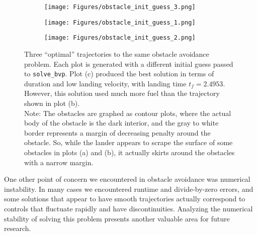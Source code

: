 \documentclass{article}
\begin{document}
\begin{figure}[hbt]
    \centering

    \begin{subfigure}{0.45\textwidth}
        \centering 
        \texttt{[image: Figures/obstacle\_init\_guess\_3.png]}
        \caption{}
    \end{subfigure}
    \hspace{0.05\textwidth}
    \begin{subfigure}{0.45\textwidth}
        \centering 
        \texttt{[image: Figures/obstacle\_init\_guess\_1.png]}
        \caption{}
    \end{subfigure}

    \vspace{0.5cm}

    \begin{subfigure}{0.45\textwidth}
        \centering 
        \texttt{[image: Figures/obstacle\_init\_guess\_2.png]}
        \caption{}
    \end{subfigure}

    \caption{Three ``optimal'' trajectories to the same obstacle avoidance problem. Each plot is generated with a different initial guess passed to \texttt{solve\_bvp}. Plot (c) produced the best solution in terms of duration and low landing velocity, with landing time $t_f = 2.4953$. However, this solution used much more fuel than the trajectory shown in plot (b). \\
    Note: The obstacles are graphed as contour plots, where the actual body of the obstacle is the dark interior, and the gray to white border represents a margin of decreasing penalty around the obstacle. So, while the lander appears to scrape the surface of some obstacles in plots (a) and (b), it actually skirts around the obstacles with a narrow margin.}
    \label{initial_guesses}
\end{figure}



One other point of concern we encountered in obstacle avoidance was numerical instability. In many cases we encountered runtime and divide-by-zero errors, and some solutions that appear to have smooth trajectories actually correspond to controls that fluctuate rapidly and have discontinuities. Analyzing the numerical stability of solving this problem presents another valuable area for future research.

\pagebreak
\end{document}
